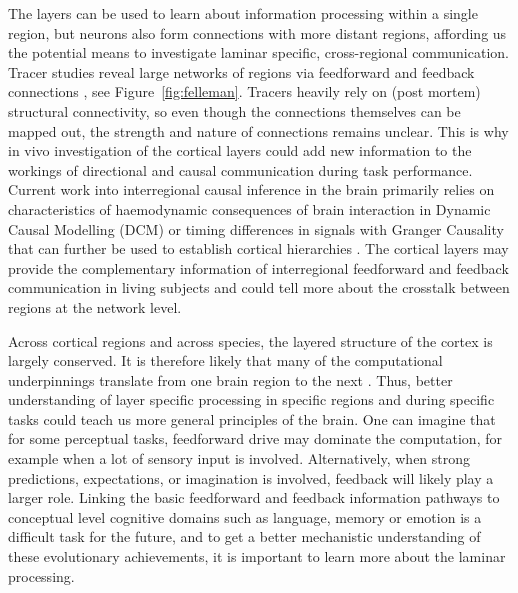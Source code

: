 The layers can be used to learn about information processing within a single region, but neurons also form connections with more distant regions, affording us the potential means to investigate laminar specific,  cross-regional communication. Tracer studies reveal large networks of regions via feedforward and feedback connections \cite{Felleman1991}, see Figure~\ref{fig:felleman}. Tracers heavily rely on (post mortem) structural connectivity, so even though the connections themselves can be mapped out, the strength and nature of connections remains unclear. This is why in vivo investigation of the cortical layers could add new information to the workings of directional and causal communication during task performance. Current work into interregional causal inference in the brain primarily relies on characteristics of haemodynamic consequences of brain interaction in Dynamic Causal Modelling (DCM) \cite{Friston2009} or timing differences in signals with Granger Causality \cite{Aalen2007} that can further be used to establish cortical hierarchies \cite{Michalareas2016}. The cortical layers may provide the complementary information of interregional feedforward and feedback communication in living subjects and could tell more about the crosstalk between regions at the network level.


Across cortical regions and across species, the layered structure of the cortex is largely conserved. It is therefore likely that many of the computational underpinnings translate from one brain region to the next \cite{Buonomano1998}. Thus, better understanding of layer specific processing in specific regions and during specific tasks could teach us more general principles of the brain. One can imagine that for some perceptual tasks, feedforward drive may dominate the computation, for example when a lot of sensory input is involved. Alternatively, when strong predictions, expectations, or imagination is involved, feedback will likely play a larger role. Linking the basic feedforward and feedback information pathways to conceptual level cognitive domains such as language, memory or emotion is a difficult task for the future, and to get a better mechanistic understanding of these evolutionary achievements, it is important to learn more about the laminar processing.

